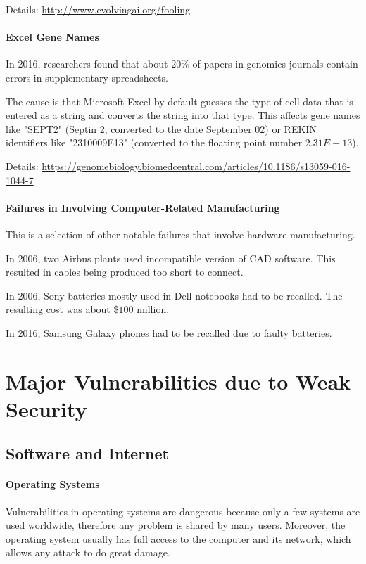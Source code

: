 Details: \url{http://www.evolvingai.org/fooling}

\paragraph{Excel Gene Names}
In 2016, researchers found that about 20\% of papers in genomics journals contain errors in supplementary spreadsheets.

The cause is that Microsoft Excel by default guesses the type of cell data that is entered as a string and converts the string into that type.
This affects gene names like "SEPT2" (Septin 2, converted to the date September 02) or REKIN identifiers like "2310009E13" (converted to the floating point number $2.31E+13$).

Details: \url{https://genomebiology.biomedcentral.com/articles/10.1186/s13059-016-1044-7}

\paragraph{Failures in Involving Computer-Related Manufacturing}
This is a selection of other notable failures that involve hardware manufacturing.

In 2006, two Airbus plants used incompatible version of CAD software.
This resulted in cables being produced too short to connect.

In 2006, Sony batteries mostly used in Dell notebooks had to be recalled.
The resulting cost was about \$$100$ million.

In 2016, Samsung Galaxy phones had to be recalled due to faulty batteries.

\section{Major Vulnerabilities due to Weak Security}

\subsection{Software and Internet}

\paragraph{Operating Systems}
Vulnerabilities in operating systems are dangerous because only a few systems are used worldwide, therefore any problem is shared by many users.
Moreover, the operating system usually has full access to the computer and its network, which allows any attack to do great damage.

